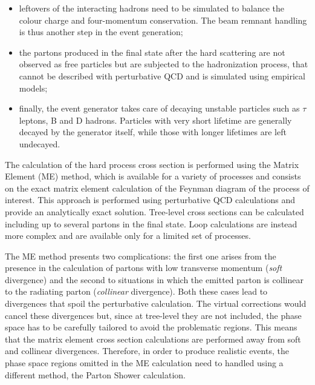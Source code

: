 \begin{itemize}
\item leftovers of the interacting hadrons need to be simulated to balance the colour charge
and four-momentum conservation. The beam remnant handling is thus another step in the event generation;

\item the partons produced in the final state after the hard scattering are not observed as free particles but are subjected to the hadronization process, that cannot be described with perturbative QCD and is simulated using empirical models;

\item finally, the event generator takes care of decaying unstable particles such as $\tau$ leptons, B and D hadrons. Particles with very short lifetime are generally decayed by the generator itself, while those with longer lifetimes are left undecayed.
\end{itemize}

The calculation of the hard process cross section is performed using the Matrix Element (ME) method, which is available for a variety of processes and consists on the exact matrix element calculation of the Feynman diagram of the process of interest. This approach is performed using perturbative QCD calculations and provide an analytically exact solution. Tree-level cross sections can be calculated including up to several partons in the final state. Loop calculations are instead more complex and are available only for a limited set of processes. 

The ME method presents two complications: the first one arises from the presence in the calculation of partons with low transverse momentum (\emph{soft} divergence) and the second to situations in which the emitted parton is collinear to the radiating parton (\emph{collinear} divergence). Both these cases lead to divergences that spoil the perturbative calculation. The virtual corrections would cancel these divergences but, since at tree-level they are not included, the phase space has to be carefully tailored to avoid the problematic regions. This means that the matrix
element cross section calculations are performed away from soft and collinear divergences. Therefore, in order to produce realistic events, the phase space regions omitted in the ME calculation need to handled using a different method, the Parton Shower calculation.

